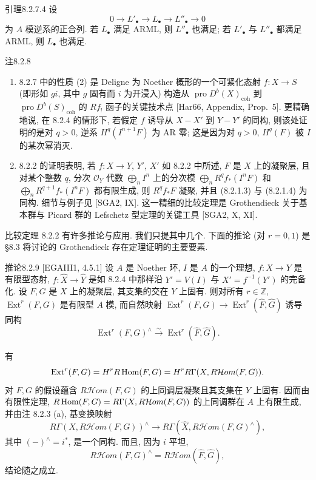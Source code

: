 \begin{origstatement}{引理}{8.2.7.4}\label{ch08:lem8274}
设
\[0\longrightarrow L'_\bullet\longrightarrow L_\bullet\longrightarrow L''_\bullet\longrightarrow0\]
为 $A$ 模逆系的正合列. 若 $L_\bullet$ 满足 ARML, 则 $L''_\bullet$ 也满足; 若 $L'_\bullet$ 与 $L''_\bullet$ 都满足 ARML, 则 $L_\bullet$ 也满足.
\end{origstatement}

\begin{origstatement}{注}{8.2.8}\label{ch08:rem828}
\begin{enumerate}
\item[(a)] 8.2.7 中的性质 (2) 是 Deligne 为 Noether 概形的一个可紧化态射 $f:X\to S$ (即形如 $gi$, 其中 $g$ 固有而 $i$ 为开浸入) 构造从 $\operatorname{pro}D^b(X)_{\mathrm{coh}}$ 到 $\operatorname{pro}D^b(S)_{\mathrm{coh}}$ 的 $Rf_!$ 函子的关键技术点 [Har66, Appendix, Prop.~5]. 更精确地说, 在 8.2.4 的情形下, 若假定 $f$ 诱导从 $X-X'$ 到 $Y-Y'$ 的同构, 则该处证明的是对 $q>0$, 逆系 $H^q(I^{n+1}F)$ 为 AR 零; 这是因为对 $q>0$, $H^q(F)$ 被 $I$ 的某次幂消灭.
\item[(b)] 8.2.2 的证明表明, 若 $f:X\to Y$, $Y'$, $X'$ 如 8.2.2 中所述, $F$ 是 $X$ 上的凝聚层, 且对某个整数 $q$, 分次 $\mathcal O_Y$ 代数 $\bigoplus_nI^n$ 上的分次模 $\bigoplus_nR^qf_*(I^nF)$ 和 $\bigoplus_nR^{q+1}f_*(I^nF)$ 都有限生成, 则 $R^qf_*F$ 凝聚, 并且 (8.2.1.3) 与 (8.2.1.4) 为同构. 细节与例子见 [SGA2, IX]. 这一精细的比较定理是 Grothendieck 关于基本群与 Picard 群的 Lefschetz 型定理的关键工具 [SGA2, X, XI].
\end{enumerate}
\end{origstatement}
比较定理 8.2.2 有许多推论与应用. 我们只提其中几个. 下面的推论 (对 $r=0,1$) 是 §8.3 将讨论的 Grothendieck 存在定理证明的主要要素.

\begin{origstatement}{推论}{8.2.9}\label{ch08:cor829}
[EGAIII1, 4.5.1] 设 $A$ 是 Noether 环, $I$ 是 $A$ 的一个理想, $f:X\to Y$ 是有限型态射, $\widehat f:\widehat X\to\widehat Y$ 是如 8.2.4 中那样沿 $Y'=V(I)$ 与 $X'=f^{-1}(Y')$ 的完备化. 设 $F,G$ 是 $X$ 上的凝聚层, 其支集的交在 $Y$ 上固有. 则对所有 $r\in\mathbb Z$, $\operatorname{Ext}^r(F,G)$ 是有限型 $A$ 模, 而自然映射 $\operatorname{Ext}^r(F,G)\to\operatorname{Ext}^r(\widehat F,\widehat G)$ 诱导同构
\begin{equation}\operatorname{Ext}^r(F,G)^\wedge\xrightarrow\sim\operatorname{Ext}^r(\widehat F,\widehat G).\tag{8.2.9.1}\label{ch08:eq8291}\end{equation}
\end{origstatement}
有
\[\operatorname{Ext}^r(F,G)=H^rR\operatorname{Hom}(F,G)=H^rR\Gamma(X,R\mathcal Hom(F,G)).\]
对 $F,G$ 的假设蕴含 $R\mathcal Hom(F,G)$ 的上同调层凝聚且其支集在 $Y$ 上固有. 因而由有限性定理, $R\operatorname{Hom}(F,G)=R\Gamma(X,R\mathcal Hom(F,G))$ 的上同调群在 $A$ 上有限生成, 并由注 8.2.3 (a), 基变换映射
\[R\Gamma(X,R\mathcal Hom(F,G))^\wedge\longrightarrow R\Gamma(\widehat X,R\mathcal Hom(F,G)^\wedge),\]
其中 $(-)^\wedge=i^*$, 是一个同构. 而且, 因为 $i$ 平坦,
\[R\mathcal Hom(F,G)^\wedge=R\mathcal Hom(\widehat F,\widehat G),\]
结论随之成立.

